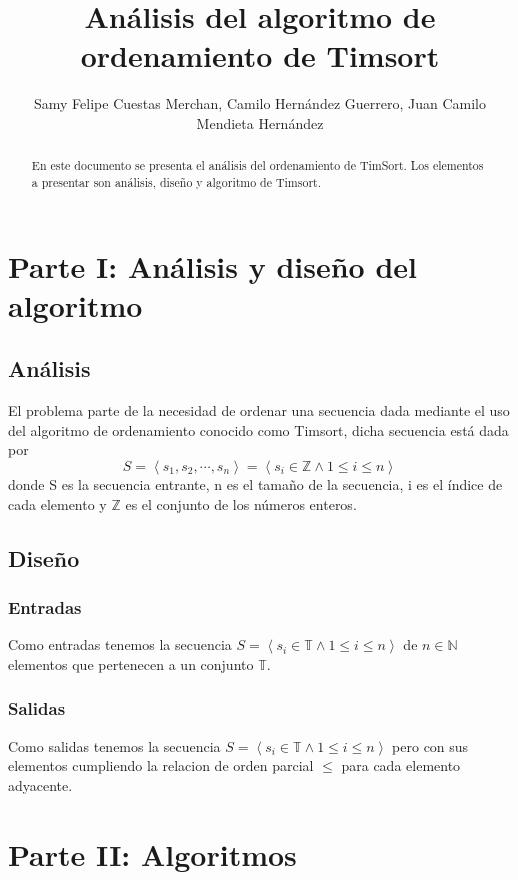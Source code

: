 \documentclass{article}
\title{Análisis del algoritmo de ordenamiento de Timsort}
\author{Samy Felipe Cuestas Merchan, Camilo Hernández Guerrero, Juan Camilo Mendieta Hernández}
\begin{document}
\maketitle

\begin{abstract}
En este documento se presenta el análisis del ordenamiento de TimSort. Los elementos a presentar son análisis, diseño y algoritmo de Timsort.
\end{abstract}

\section{Parte I: Análisis y diseño del algoritmo}
\subsection{Análisis}

El problema parte de la necesidad de ordenar una secuencia dada mediante el uso del algoritmo de ordenamiento conocido como Timsort, dicha secuencia está dada por
\[
S=\left\langle s_{1},s_{2},\cdots,s_{n}\right\rangle =\left\langle s_{i}\in\mathbb{Z}\land1\le i\le n\right\rangle 
\]
donde S es la secuencia entrante, n es el tamaño de la secuencia, i es el índice de cada elemento y $\mathbb{Z}$ es el conjunto de los números enteros.
\subsection{Diseño}

\subsubsection{Entradas}

Como entradas tenemos la secuencia $S = \left\langle s_{i}\in\mathbb{T}\land1\le i\le n\right\rangle $ de $n\in\mathbb{N}$ elementos que pertenecen a un conjunto $\mathbb{T}$. 
\subsubsection{Salidas}

Como salidas tenemos la secuencia $S = \left\langle s_{i}\in\mathbb{T}\land1\le i\le n\right\rangle $ pero con sus elementos cumpliendo la relacion de orden parcial $\leq$ para cada elemento adyacente.

\section{Parte II: Algoritmos}
\end{document}
